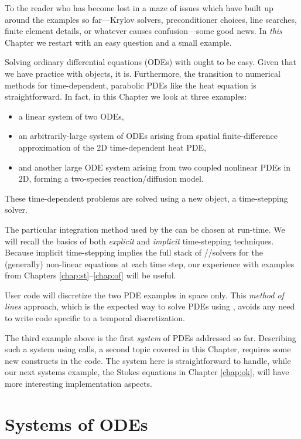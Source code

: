 
To the reader who has become lost in a maze of issues which have built up around the examples so far---Krylov solvers, preconditioner choices, line searches, finite element details, or whatever causes confusion---some good news.  In \emph{this} Chapter we restart with an easy question and a small example.

Solving ordinary differential equations (ODEs) with \PETSc ought to be easy.  Given that we have practice with \PETSc objects, it is.  Furthermore, the transition to numerical methods for time-dependent, parabolic PDEs like the heat equation is straightforward.  In fact, in this Chapter we look at three examples:
\begin{itemize}
\item a linear system of two ODEs,
\item an arbitrarily-large system of ODEs arising from spatial finite-difference approximation of the 2D time-dependent heat PDE,
\item and another large ODE system arising from two coupled nonlinear PDEs in 2D, forming a two-species reaction/diffusion model.
\end{itemize}
These time-dependent problems are solved using a new \PETSc object, a \pTS time-stepping solver.

The particular integration method used by the \pTS can be chosen at run-time.  We will recall the basics of both \emph{explicit} and \emph{implicit} time-stepping techniques.  Because implicit time-stepping implies the full stack of \pSNES/\pKSP/\pPC solvers for the (generally) non-linear equations at each time step, our experience with examples from Chapters \ref{chap:st}--\ref{chap:of} will be useful.

User code will discretize the two PDE examples in space only.  This \emph{method of lines} approach, which is the expected way to solve PDEs using \PETSc \pTS, avoids any need to write code specific to a temporal discretization.

The third example above is the first \emph{system} of PDEs addressed so far.  Describing such a system using \PETSc calls, a second topic covered in this Chapter, requires some new constructs in the code.  The system here is straightforward to handle, while our next systems example, the Stokes equations in Chapter \ref{chap:ok}, will have more interesting implementation aspects.


\section{Systems of ODEs}

